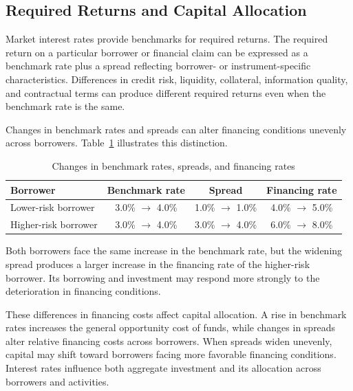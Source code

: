 \subsection{Required Returns and Capital Allocation}

Market interest rates provide benchmarks for required returns. The required return on a particular borrower or financial claim can be expressed as a benchmark rate plus a spread reflecting borrower- or instrument-specific characteristics. Differences in credit risk, liquidity, collateral, information quality, and contractual terms can produce different required returns even when the benchmark rate is the same.

Changes in benchmark rates and spreads can alter financing conditions unevenly across borrowers. Table~\ref{tab:ch6-borrower-financing-rates} illustrates this distinction.

\begin{table}[H]

\centering

\caption{Changes in benchmark rates, spreads, and financing rates}

\label{tab:ch6-borrower-financing-rates}

\begin{tabular}{@{}lccc@{}}

\toprule

\textbf{Borrower} &
\textbf{Benchmark rate} &
\textbf{Spread} &
\textbf{Financing rate} \\

\midrule

Lower-risk borrower
& 3.0\% $\rightarrow$ 4.0\%
& 1.0\% $\rightarrow$ 1.0\%
& 4.0\% $\rightarrow$ 5.0\% \\

Higher-risk borrower
& 3.0\% $\rightarrow$ 4.0\%& 3.0\% $\rightarrow$ 4.0\%
& 6.0\% $\rightarrow$ 8.0\% \\

\bottomrule

\end{tabular}

\end{table}

Both borrowers face the same increase in the benchmark rate, but the widening spread produces a larger increase in the financing rate of the higher-risk borrower. Its borrowing and investment may respond more strongly to the deterioration in financing conditions.

These differences in financing costs affect capital allocation. A rise in benchmark rates increases the general opportunity cost of funds, while changes in spreads alter relative financing costs across borrowers. When spreads widen unevenly, capital may shift toward borrowers facing more favorable financing conditions. Interest rates influence both aggregate investment and its allocation across borrowers and activities.

